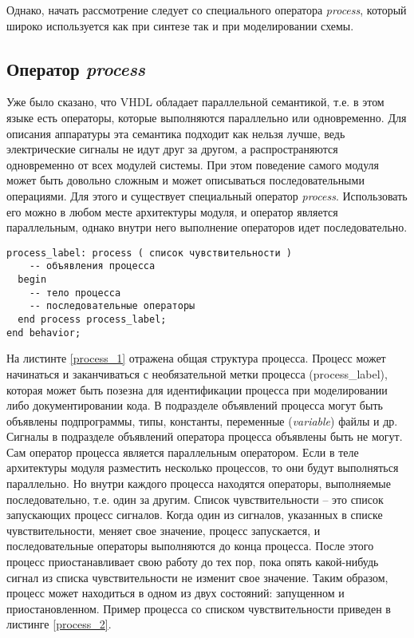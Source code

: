 Однако, начать рассмотрение следует со специального оператора \emph{process}, который широко используется как при синтезе так и при моделировании схемы.

\subsection{Оператор \emph{process}}

Уже было сказано, что VHDL обладает параллельной семантикой, т.е. в этом языке есть операторы, которые выполняются параллельно или одновременно. Для описания аппаратуры эта семантика подходит как нельзя лучше, ведь электрические сигналы не идут друг за другом, а распространяются одновременно от всех модулей системы. При этом поведение самого модуля может быть довольно сложным и может описываться последовательными операциями. Для этого и существует специальный оператор \emph{process}. Использовать его можно в любом месте архитектуры модуля, и оператор является параллельным, однако внутри него выполнение операторов идет последовательно.


\begin{Code}
\begin{lstlisting}[caption=Оператор \emph{process},label=process_1]
  process_label: process ( список чувствительности )
    -- объявления процесса
  begin
    -- тело процесса
    -- последовательные операторы
  end process process_label;
end behavior;
\end{lstlisting}
\end{Code}

На листинте \ref{process_1} отражена общая структура процесса. Процесс может начинаться и заканчиваться с необязательной метки процесса (process\_label), которая может быть позезна для идентификации процесса при моделировании либо документировании кода. В подразделе объявлений  процесса могут быть объявлены подпрограммы, типы,  константы, переменные (\emph{variable}) файлы и др. Сигналы в подразделе объявлений оператора процесса объявлены быть не могут. Сам оператор процесса является параллельным оператором. Если в  теле архитектуры модуля разместить несколько процессов, то они будут выполняться параллельно. Но внутри каждого процесса находятся операторы, выполняемые последовательно, т.е. один за другим. Список чувствительности – это список запускающих процесс сигналов. Когда один из сигналов, указанных в списке чувствительности, меняет свое значение, процесс запускается, и последовательные операторы выполняются до конца процесса. После этого процесс приостанавливает свою работу до тех пор, пока опять какой-нибудь сигнал из списка чувствительности не изменит свое значение. Таким образом, процесс может находиться в одном из двух состояний: запущенном и приостановленном.
Пример процесса со списком чувствительности приведен в листинге \ref{process_2}.


